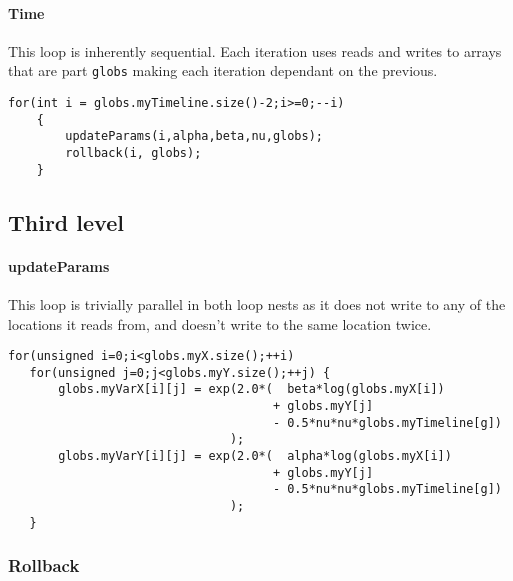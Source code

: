 \paragraph{Time}
This loop is inherently sequential. Each iteration uses reads and writes to arrays that are part \verb!globs! making
 each iteration dependant on the previous.
\begin{lstlisting}[caption=Timeline loop, label=timeloop]
for(int i = globs.myTimeline.size()-2;i>=0;--i)
    {
        updateParams(i,alpha,beta,nu,globs);
        rollback(i, globs);
    }
\end{lstlisting}

\subsection{Third level}
\label{sec:third}

\paragraph{updateParams}
This loop is trivially parallel in both loop nests as it does not write to any of the locations it reads from, and
 doesn't write to the same location twice.
\begin{lstlisting}[caption=Loop in updateParams(), label=updpar]
for(unsigned i=0;i<globs.myX.size();++i)
   for(unsigned j=0;j<globs.myY.size();++j) {
       globs.myVarX[i][j] = exp(2.0*(  beta*log(globs.myX[i])
                                     + globs.myY[j]
                                     - 0.5*nu*nu*globs.myTimeline[g])
                               );
       globs.myVarY[i][j] = exp(2.0*(  alpha*log(globs.myX[i])
                                     + globs.myY[j]
                                     - 0.5*nu*nu*globs.myTimeline[g])
                               );
   }
\end{lstlisting}

\subsubsection{Rollback}

